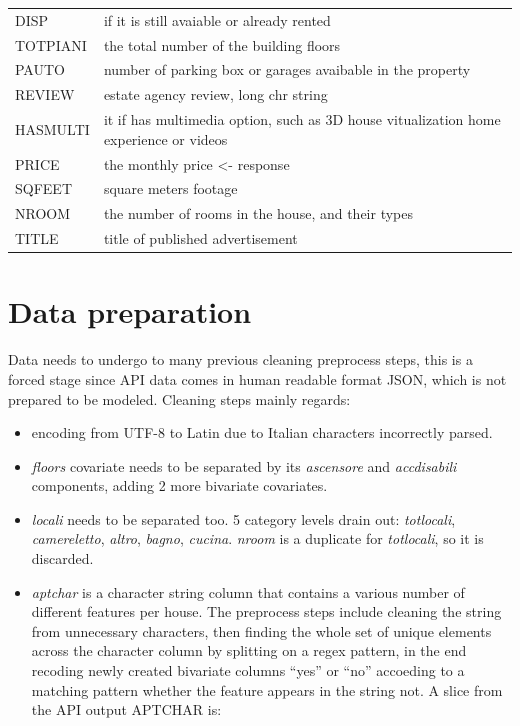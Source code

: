 \documentclass[
  12pt,
  a4paper,
  oneside]{book}
\providecommand{\tightlist}{%
  \setlength{\itemsep}{0pt}\setlength{\parskip}{0pt}}
\theoremstyle{definition}
\theoremstyle{definition}
\theoremstyle{definition}
\theoremstyle{remark}
\begin{document}
\begin{longtable}{ll}
DISP & if it is still avaiable or already rented\\
\addlinespace
TOTPIANI & the total number of the building floors\\
PAUTO & number of parking box or garages avaibable in the property\\
REVIEW & estate agency review, long chr string\\
HASMULTI & it if has multimedia option, such as 3D house vitualization home experience or videos\\
PRICE & the monthly price <- response\\
\addlinespace
SQFEET & square meters footage\\
NROOM & the number of rooms in the house, and their types\\
TITLE & title of published advertisement\\
\bottomrule
\end{longtable}

\hypertarget{prep}{%
\section{Data preparation}\label{prep}}

Data needs to undergo to many previous cleaning preprocess steps, this is a forced stage since API data comes in human readable format JSON, which is not prepared to be modeled. Cleaning steps mainly regards:

\begin{itemize}
\tightlist
\item
  encoding from UTF-8 to Latin due to Italian characters incorrectly parsed.
\item
  \emph{floors} covariate needs to be separated by its \emph{ascensore} and \emph{accdisabili} components, adding 2 more bivariate covariates.
\item
  \emph{locali} needs to be separated too. 5 category levels drain out: \emph{totlocali}, \emph{camereletto}, \emph{altro}, \emph{bagno}, \emph{cucina}. \emph{nroom} is a duplicate for \emph{totlocali}, so it is discarded.
\item
  \emph{aptchar} is a character string column that contains a various number of different features per house. The preprocess steps include cleaning the string from unnecessary characters, then finding the whole set of unique elements across the character column by splitting on a regex pattern, in the end recoding newly created bivariate columns ``yes'' or ``no'' accoeding to a matching pattern whether the feature appears in the string not. A slice from the API output APTCHAR is:
\end{itemize}
\end{document}
